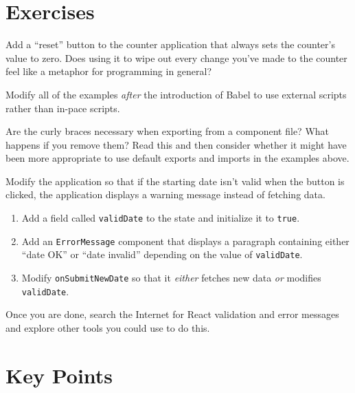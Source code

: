 \section{Exercises}\label{s:interactive-exercises}


Add a ``reset'' button to the counter application that always sets the counter's value to zero.
Does using it to wipe out every change you've made to the counter
feel like a metaphor for programming in general?


Modify all of the examples \emph{after} the introduction of Babel
to use external scripts rather than in-pace scripts.


Are the curly braces necessary when exporting from a component file?
What happens if you remove them?
Read this  and then consider whether it might
have been more appropriate to use default exports and imports
in the examples above.


Modify the application so that if the starting date isn't valid when the button is clicked,
the application displays a warning message instead of fetching data.

\begin{enumerate}
\item
  Add a field called \texttt{validDate} to the state and initialize it to \texttt{true}.
\item
  Add an \texttt{ErrorMessage} component that displays a paragraph containing either ``date OK'' or ``date invalid''
  depending on the value of \texttt{validDate}.
\item
  Modify \texttt{onSubmitNewDate} so that it \emph{either} fetches new data \emph{or} modifies \texttt{validDate}.
\end{enumerate}

Once you are done,
search the Internet for React validation and error messages
and explore other tools you could use to do this.

\section*{Key Points}


